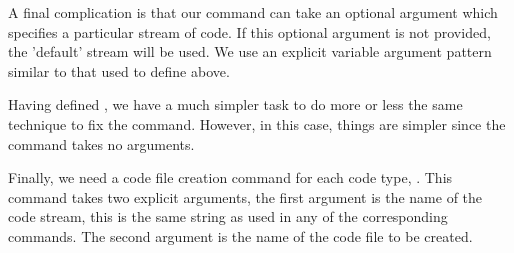 A final complication is that our \type{\startXXX} command can take an 
optional argument which specifies a particular stream of code. If this 
optional argument is not provided, the 'default' stream will be used. We 
use an explicit variable argument pattern similar to that used to define 
 above. 

\startMkIVCode
\def\fixStartLitProgs#1{%
  \letvalue{oldStart#1}=\getvalue{start#1}%
  \setuvalue{start#1}{%
    \dosingleempty\getvalue{start#1Direct}%
  }
  \setvalue{start#1Direct}{%
    \iffirstargument%
      \getvalue{start#1Single}%
    \else
      \getvalue{start#1Zero}%
    \fi
  }
  \setvalue{start#1Zero}{%
    \getvalue{start#1Single}[default]%
  }
  \setvalue{start#1Single}[#1]{%
    \directlua{thirddata.literateProgs.setCodeStream('#1')}%
    \getvalue{oldStart#1}%
  }
}
\stopMkIVCode

Having defined \type{\fixStartLitProgs}, we have a much simpler task to do 
more or less the same technique to fix the \type{\stopXXX} command. 
However, in this case, things are simpler since the \type{\stopXXX} 
command takes no arguments. 

\startMkIVCode
\def\fixStopLitProgs#1{%
  \letvalue{oldStop#1}=\getvalue{stop#1}%
  \setvalue{stop#1}{%
    \getvalue{oldStop#1}%
    \directlua{
      thirddata.literateProgs.addCode(
        '#1',
        '_typing_'
      )
    }
  }
}
\stopMkIVCode




Finally, we need a code file creation command for each code type, 
\type{\createXXXFile}. This command takes two explicit arguments, the 
first argument is the name of the code stream, this is the same string as 
used in any of the corresponding \type{\startXXX} commands. The second 
argument is the name of the code file to be created. 

